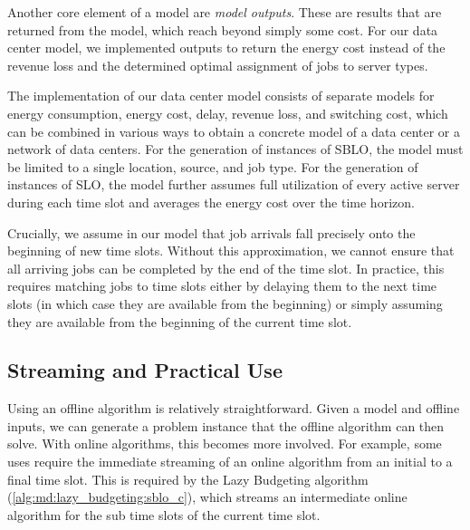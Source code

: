 Another core element of a model are \emph{model outputs}. These are results that are returned from the model, which reach beyond simply some cost. For our data center model, we implemented outputs to return the energy cost instead of the revenue loss and the determined optimal assignment of jobs to server types.

The implementation of our data center model consists of separate models for energy consumption, energy cost, delay, revenue loss, and switching cost, which can be combined in various ways to obtain a concrete model of a data center or a network of data centers. For the generation of instances of SBLO, the model must be limited to a single location, source, and job type. For the generation of instances of SLO, the model further assumes full utilization of every active server during each time slot and averages the energy cost over the time horizon.

Crucially, we assume in our model that job arrivals fall precisely onto the beginning of new time slots. Without this approximation, we cannot ensure that all arriving jobs can be completed by the end of the time slot. In practice, this requires matching jobs to time slots either by delaying them to the next time slots (in which case they are available from the beginning) or simply assuming they are available from the beginning of the current time slot.

\subsection{Streaming and Practical Use}\label{section:implementation:architecture:streaming}

Using an offline algorithm is relatively straightforward. Given a model and offline inputs, we can generate a problem instance that the offline algorithm can then solve. With online algorithms, this becomes more involved. For example, some uses require the immediate streaming of an online algorithm from an initial to a final time slot. This is required by the Lazy Budgeting algorithm (\cref{alg:md:lazy_budgeting:sblo_c}), which streams an intermediate online algorithm for the sub time slots of the current time slot.

